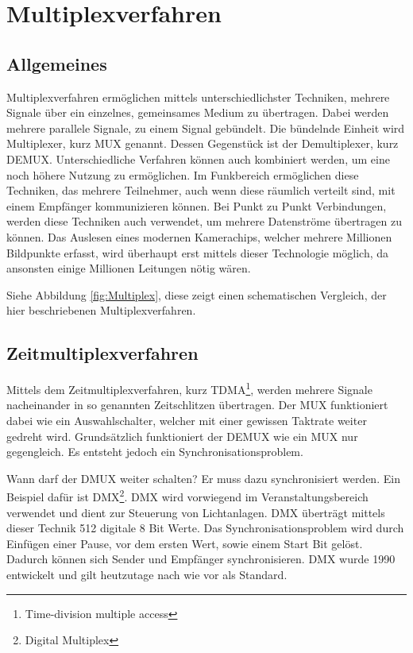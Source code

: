 \chapter{Multiplexverfahren}
\label{cha:Multiplex}
\section{Allgemeines}
Multiplexverfahren ermöglichen mittels unterschiedlichster Techniken, mehrere Signale über ein einzelnes, gemeinsames Medium zu übertragen. Dabei werden mehrere parallele Signale, zu einem Signal gebündelt. Die bündelnde Einheit wird Multiplexer, kurz MUX genannt. Dessen Gegenstück ist der Demultiplexer, kurz DEMUX. Unterschiedliche Verfahren können auch kombiniert werden, um eine noch höhere Nutzung zu ermöglichen. Im Funkbereich ermöglichen diese Techniken, das mehrere Teilnehmer, auch wenn diese räumlich verteilt sind, mit einem Empfänger kommunizieren können. Bei Punkt zu Punkt Verbindungen, werden diese Techniken auch verwendet, um mehrere Datenströme übertragen zu können. Das Auslesen eines modernen Kamerachips, welcher mehrere Millionen Bildpunkte erfasst, wird überhaupt erst mittels dieser Technologie möglich, da ansonsten einige Millionen Leitungen nötig wären. 

Siehe Abbildung \ref{fig:Multiplex}, diese zeigt einen schematischen Vergleich, der hier beschriebenen Multiplexverfahren.

\section{Zeitmultiplexverfahren}
Mittels dem Zeitmultiplexverfahren, kurz TDMA\footnote{Time-division multiple access}, werden mehrere Signale nacheinander in so genannten Zeitschlitzen übertragen. Der MUX funktioniert dabei wie ein Auswahlschalter, welcher mit einer gewissen Taktrate weiter gedreht wird. Grundsätzlich funktioniert der DEMUX wie ein MUX nur gegengleich. Es entsteht jedoch ein Synchronisationsproblem. 

Wann darf der DMUX weiter schalten? Er muss dazu synchronisiert werden. Ein Beispiel dafür ist DMX\footnote{Digital Multiplex}. DMX wird vorwiegend im Veranstaltungsbereich verwendet und dient zur Steuerung von Lichtanlagen. DMX überträgt mittels dieser Technik 512 digitale 8 Bit Werte. Das Synchronisationsproblem wird durch Einfügen einer Pause, vor dem ersten Wert, sowie einem Start Bit gelöst. Dadurch können sich Sender und Empfänger synchronisieren. DMX wurde 1990 entwickelt und gilt heutzutage nach wie vor als Standard.


